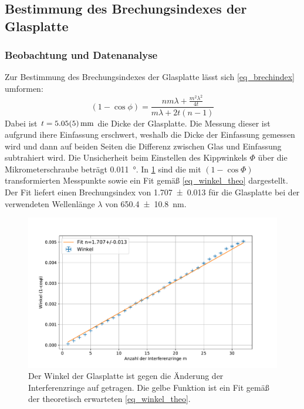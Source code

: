 \documentclass[
	a4paper,
	12pt,
	pagesize,
	ngerman
]{scrartcl}
\begin{document}
	\subsection{Bestimmung des Brechungsindexes der Glasplatte}
	\subsubsection{Beobachtung und Datenanalyse}
	Zur Bestimmung des Brechungsindexes der Glasplatte lässt sich \cref{eq_brechindex} umformen:
	\begin{equation}
		(1-\cos{\phi}) = \frac{nm\lambda+\frac{m^2\lambda^2}{4t}}{m\lambda+2t(n-1)}
		\label{eq_winkel_theo}
	\end{equation}
	Dabei ist $t= \SI{5.05+-0.05}{mm}$ die Dicke der Glasplatte.
	Die Messung dieser ist aufgrund ihere Einfassung erschwert, weshalb die Dicke der Einfassung gemessen wird und dann auf beiden Seiten die Differenz zwischen Glas und Einfassung subtrahiert wird.
	Die Unsicherheit beim Einstellen des Kippwinkels $\Phi$ über die Mikrometerschraube beträgt \SI{0.011}{\degree}.
	In \cref{fig_glas} sind die mit $(1-\cos{\Phi})$ transformierten Messpunkte sowie ein Fit gemäß \cref{eq_winkel_theo} dargestellt.
	Der Fit liefert einen Brechungsindex von \SI{1.707+-0.013}{} für die Glasplatte bei der verwendeten Wellenlänge $\lambda$ von \SI{650.4+-10.8}{nm}.

\begin{figure}[H]
		\includegraphics[width=\textwidth]{images/Glas.pdf}
		\centering
		\caption{Der Winkel der Glasplatte ist gegen die Änderung der Interferenzringe auf getragen.
		Die gelbe Funktion ist ein Fit gemäß der theoretisch erwarteten \cref{eq_winkel_theo}.}
		\label{fig_glas}
	\end{figure}
\end{document}
